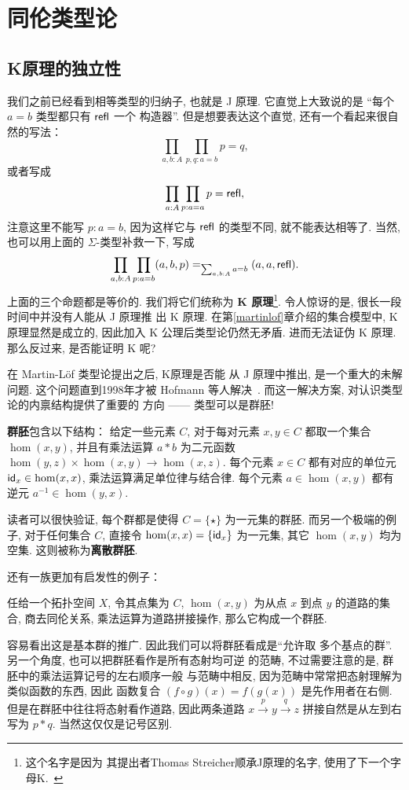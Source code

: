\chapter{同伦类型论}
\section{K原理的独立性}\label{hott:independent}
我们之前已经看到相等类型的归纳子, 也就是 J 原理. 它直觉上大致说的是
“每个 \(a = b\) 类型都只有 \(\textnormal{\textsf{refl}}\) 一个
构造器”. 但是想要表达这个直觉, 还有一个看起来很自然的写法：
\[\prod_{a,b : A} \prod_{p,q : a = b} p = q,\]
或者写成
\[\prod_{a : A} \prod_{p : a = a} p = \textnormal{\textsf{refl}},\]
注意这里不能写 \(p : a = b\), 因为这样它与
\(\textnormal{\textsf{refl}}\) 的类型不同, 就不能表达相等了.
当然, 也可以用上面的 \(\Sigma\)-类型补救一下, 写成
\[\prod_{a,b : A} \prod_{p: a = b} (a,b,p) =_{\sum_{a,b : A}a = b} (a,a,\textnormal{\textsf{refl}}).\]
上面的三个命题都是等价的. 我们将它们统称为
\textbf{K 原理}\footnote{这个名字是因为
其提出者Thomas Streicher顺承J原理的名字, 使用了下一个字母K.~\cite{streicher:1993:K}}.
令人惊讶的是, 很长一段时间中并没有人能从 J 原理推
出 K 原理. 在第\ref{martinlof}章介绍的集合模型中,
K 原理显然是成立的, 因此加入 K 公理后类型论仍然无矛盾.
进而无法证伪 K 原理. 那么反过来, 是否能证明 K 呢?

在 Martin-L\"of 类型论提出之后, K原理是否能
从 J 原理中推出, 是一个重大的未解问题.
这个问题直到1998年才被 Hofmann 等人解决~\cite{hofmann:1998:groupoid}.
而这一解决方案, 对认识类型论的内禀结构提供了重要的
方向 ------ 类型可以是群胚!

\begin{definition}
\textbf{群胚}包含以下结构：
给定一些元素 \(C\), 对于每对元素 \(x,y\in C\)
都取一个集合 \(\hom(x,y)\), 并且有乘法运算
\(a * b\) 为二元函数 \(\hom(y,z) \times \hom(x,y) \to \hom(x,z)\).
每个元素 \(x \in C\) 都有对应的单位元
\(\textnormal{\textsf{id}}_x \in \hom(x,x)\), 乘法运算满足单位律与结合律.
每个元素 \(a \in \hom(x,y)\) 都有逆元
\(a^{-1} \in \hom(y,x)\).
\end{definition}
读者可以很快验证, 每个群都是使得 \(C = \{\star\}\)
为一元集的群胚. 而另一个极端的例子, 对于任何集合 \(C\),
直接令 \(\hom(x,x) = \{\textnormal{\textsf{id}}_x\}\) 为一元集, 其它 \(\hom(x,y)\)
均为空集. 这则被称为\textbf{离散群胚}.

还有一族更加有启发性的例子：
\begin{example}
任给一个拓扑空间 \(X\), 令其点集为
\(C\), \(\hom(x,y)\) 为从点 \(x\) 到点
\(y\) 的道路的集合, 商去同伦关系,
乘法运算为道路拼接操作, 那么它构成一个群胚.
\end{example}
容易看出这是基本群的推广. 因此我们可以将群胚看成是“允许取
多个基点的群”. 另一个角度, 也可以把群胚看作是所有态射均可逆
的范畴, 不过需要注意的是, 群胚中的乘法运算记号的左右顺序一般
与范畴中相反, 因为范畴中常常把态射理解为类似函数的东西, 因此
函数复合 \((f \circ g)(x) = f(g(x))\) 是先作用者在右侧.
但是在群胚中往往将态射看作道路, 因此两条道路
\(x \xrightarrow p y \xrightarrow q z\)
拼接自然是从左到右写为 \(p * q\). 当然这仅仅是记号区别.

